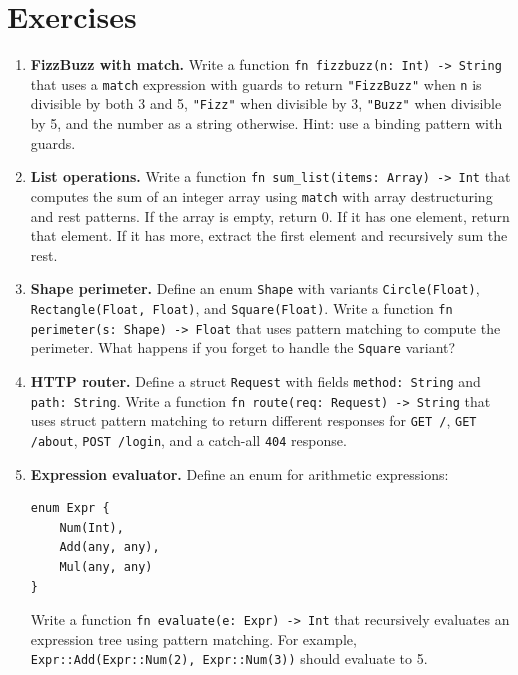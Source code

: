\section{Exercises}\label{sec:pattern-matching-exercises}

\begin{enumerate}
  \item \textbf{FizzBuzz with match.} Write a function \lstinline|fn fizzbuzz(n: Int) -> String| that uses a \lstinline|match| expression with guards to return \lstinline|"FizzBuzz"| when \lstinline|n| is divisible by both 3 and 5, \lstinline|"Fizz"| when divisible by 3, \lstinline|"Buzz"| when divisible by 5, and the number as a string otherwise. Hint: use a binding pattern with guards.

  \item \textbf{List operations.} Write a function \lstinline|fn sum_list(items: Array) -> Int| that computes the sum of an integer array using \lstinline|match| with array destructuring and rest patterns. If the array is empty, return 0. If it has one element, return that element. If it has more, extract the first element and recursively sum the rest.

  \item \textbf{Shape perimeter.} Define an enum \lstinline|Shape| with variants \lstinline|Circle(Float)|, \lstinline|Rectangle(Float, Float)|, and \lstinline|Square(Float)|. Write a function \lstinline|fn perimeter(s: Shape) -> Float| that uses pattern matching to compute the perimeter. What happens if you forget to handle the \lstinline|Square| variant?

  \item \textbf{HTTP router.} Define a struct \lstinline|Request| with fields \lstinline|method: String| and \lstinline|path: String|. Write a function \lstinline|fn route(req: Request) -> String| that uses struct pattern matching to return different responses for \lstinline|GET /|, \lstinline|GET /about|, \lstinline|POST /login|, and a catch-all \lstinline|404| response.

  \item \textbf{Expression evaluator.} Define an enum for arithmetic expressions:
  \begin{lstlisting}[language=Lattice, numbers=none]
enum Expr {
    Num(Int),
    Add(any, any),
    Mul(any, any)
}
  \end{lstlisting}
  Write a function \lstinline|fn evaluate(e: Expr) -> Int| that recursively evaluates an expression tree using pattern matching. For example, \lstinline|Expr::Add(Expr::Num(2), Expr::Num(3))| should evaluate to 5.
\end{enumerate}

